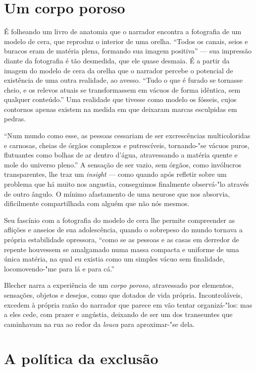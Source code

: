 \section{Um corpo poroso}

É folheando um livro de anatomia que o narrador encontra a fotografia de um modelo de cera, que reproduz o interior de uma orelha. ``Todos os canais, seios e buracos eram de matéria plena, formando sua imagem positiva'' --- sua impressão diante da fotografia é tão desmedida, que ele quase desmaia. É a partir da imagem do modelo de cera da orelha que o narrador percebe o potencial de existência de uma outra realidade, ao avesso. ``Tudo o que é furado se tornasse cheio, e os relevos atuais se transformassem em vácuos de forma idêntica, sem qualquer conteúdo.'' Uma realidade que tivesse como modelo os fósseis, cujos contornos apenas existem na medida em que deixaram marcas esculpidas em pedras.

``Num mundo como esse, as pessoas cessariam de ser excrescências multicoloridas e carnosas, cheias de órgãos complexos e putrescíveis, tornando-"se vácuos puros, flutuantes como bolhas de ar dentro d’água, atravessando a matéria quente e mole do universo pleno.'' A sensação de ser vazio, sem órgãos, como invólucros transparentes, lhe traz um \textit{insight} --- como quando após refletir sobre um problema que há muito nos angustia, conseguimos finalmente observá-"lo através de outro ângulo. O mínimo afastamento de uma neurose que nos absorvia, dificilmente compartilhada com alguém que não nós mesmos.

Seu fascínio com a fotografia do modelo de cera lhe permite compreender as aflições e anseios de sua adolescência, quando o sobrepeso do mundo tornava a própria estabilidade opressora, ``como se as pessoas e as casas em derredor de repente houvessem se amalgamado numa massa compacta e uniforme de uma única matéria, na qual eu existia como um simples vácuo sem finalidade, locomovendo-"me para lá e para cá.''

Blecher narra a experiência de um \textit{corpo poroso}, atravessado por elementos, sensações, objetos e desejos, como que dotados de vida própria. Incontroláveis, excedem à própria razão do narrador que parece em vão tentar organizá-"los: mas a eles cede, com prazer e angústia, deixando de ser um dos transeuntes que caminhavam na rua ao redor da \textit{louca} para aproximar-"se dela.

\section{A política da exclusão}

